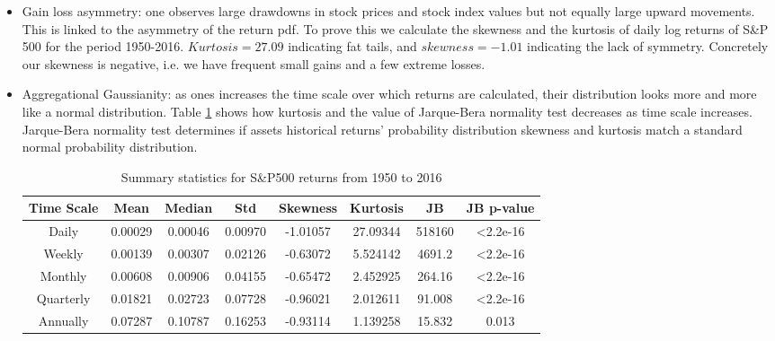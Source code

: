 \documentclass[letterpaper,12pt]{article}
\begin{document}
\begin{itemize}
\item Gain loss asymmetry: one observes large drawdowns in stock prices and stock index values but not equally large upward movements. This is linked to the asymmetry of the return pdf. To prove this we calculate the skewness and the kurtosis of daily log returns of S\&P 500 for the period 1950-2016. $Kurtosis = 27.09$ indicating fat tails, and $skewness = -1.01$ indicating the lack of symmetry. Concretely our skewness is negative, i.e. we have frequent small gains and a few extreme losses.   
\item Aggregational Gaussianity: as ones increases the time scale over which returns are calculated, their distribution looks more and more like a normal distribution. Table \ref{table:tbl1} shows how kurtosis and the value of Jarque-Bera normality test decreases as time scale increases. Jarque-Bera normality test determines if assets historical returns' probability distribution skewness and kurtosis match a standard normal probability distribution.

\begin{table}[]
\centering
\caption{Summary statistics for S\&P500 returns from 1950 to 2016}
\label{table:tbl1}
\begin{tabular}{cccccccc}
\hline
\textbf{Time Scale} & \textbf{Mean} & \textbf{Median} & \textbf{Std} & \textbf{Skewness} & \textbf{Kurtosis} & \textbf{JB} & \textbf{JB p-value} \\ \hline
Daily               & 0.00029             & 0.00046               & 0.00970            & -1.01057                 & 27.09344               & 518160         & \textless 2.2e-16               \\
Weekly              & 0.00139             & 0.00307               & 0.02126            & -0.63072                 & 5.524142               & 4691.2         & \textless 2.2e-16                 \\
Monthly             & 0.00608             & 0.00906               & 0.04155            & -0.65472                 & 2.452925               & 264.16         & \textless 2.2e-16                 \\
Quarterly           & 0.01821             & 0.02723               & 0.07728            & -0.96021                 & 2.012611               & 91.008         & \textless 2.2e-16                 \\
Annually            & 0.07287             & 0.10787               & 0.16253            & -0.93114                 & 1.139258               & 15.832         & 0.013                 \\ \hline
\end{tabular}
\end{table}



\end{itemize}
\end{document}
